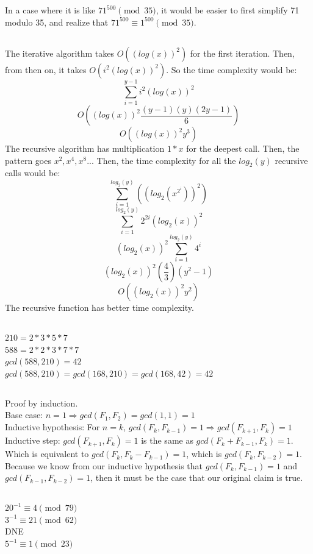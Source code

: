 \documentclass{article}
\begin{document}
\subsection{}In a case where it is like $71^{500} \pmod {35}$, it would be easier to first simplify 71 modulo 35, and realize that $71^{500} \equiv 1^{500} \pmod {35}$. 
\subsection{}The iterative algorithm takes $O((log(x))^2)$ for the first iteration. Then, from then on, it takes $O(i^2(log(x))^2)$. So the time complexity would be:
$$\sum_{i=1}^{y-1}i^2(log(x))^2$$
$$O((log(x))^2\frac{(y-1)(y)(2y-1)}{6})$$
$$O((log(x))^2y^3)$$
The recursive algorithm has multiplication $1*x$ for the deepest call. Then, the pattern goes $x^2, x^4, x^8...$ Then, the time complexity for all the $log_2(y)$ recursive calls would be:
$$\sum_{i=1}^{log_2(y)}((log_2(x^{2^i}))^2)$$
$$\sum_{i=1}^{log_2(y)}2^{2i}(log_2(x))^2$$
$$(log_2(x))^2\sum_{i=1}^{log_2(y)}4^{i}$$
$$(log_2(x))^2(\frac{4}{3})(y^2-1)$$
$$O((log_2(x))^2y^2)$$
The recursive function has better time complexity. 
\subsection{}$210=2*3*5*7$\\
$588=2*2*3*7*7$\\
$gcd(588,210)=42$\\
$gcd(588,210)=gcd(168,210)=gcd(168,42)=42$
\subsection{}Proof by induction.\\ 
Base case: $n=1 \Rightarrow gcd(F_1,F_2)=gcd(1,1)=1$\\
Inductive hypothesis: For $n=k$, $gcd(F_k,F_{k-1})=1 \Rightarrow gcd(F_{k+1},F_k)=1$
Inductive step: $gcd(F_{k+1},F_k)=1$ is the same as $gcd(F_k+F_{k-1},F_k)=1$. Which is equivalent to $gcd(F_k,F_k-F_{k-1})=1$, which is $gcd(F_k,F_{k-2})=1$. Because we know from our inductive hypothesis that $gcd(F_k,F_{k-1})=1$ and $gcd(F_{k-1},F_{k-2})=1$, then it must be the case that our original claim is true. 
\subsection{}$20^{-1} \equiv 4 \pmod{79}$\\
$3^{-1} \equiv 21 \pmod{62}$\\
DNE\\
$5^{-1} \equiv 1 \pmod{23}$
\end{document}

